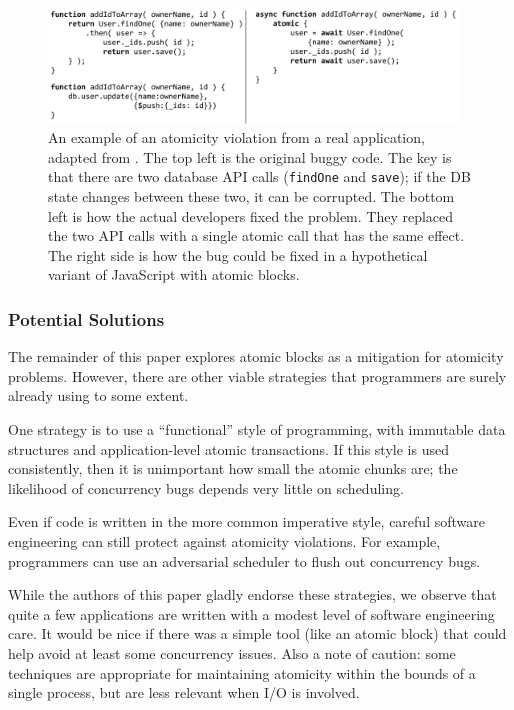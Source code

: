 \documentclass[acmsmall,anonymous,review]{acmart}\settopmatter{printfolios=true,printccs=false,printacmref=false}
\begin{document}
\begin{figure}
\includegraphics[width=0.97\textwidth]{Code/atomicity_violation}
\caption{An example of an atomicity violation from a real application, adapted from \cite{Wang2017}.
  The top left is the original buggy code.
  The key is that there are two database API calls (\texttt{findOne} and \texttt{save}); if the DB state changes between these two, it can be corrupted.
  The bottom left is how the actual developers fixed the problem.
  They replaced the two API calls with a single atomic call that has the same effect.
  The right side is how the bug could be fixed in a hypothetical variant of JavaScript with atomic blocks.}
\label{fig:atomicity_violation}
\end{figure}




\subsubsection{Potential Solutions}

The remainder of this paper explores atomic blocks as a mitigation for atomicity problems.
However, there are other viable strategies that programmers are surely already using to some extent.

One strategy is to use a ``functional'' style of programming, with immutable data structures and application-level atomic transactions.
If this style is used consistently, then it is unimportant how small the atomic chunks are; the likelihood of concurrency bugs depends very little on scheduling.

Even if code is written in the more common imperative style, careful software engineering can still protect against atomicity violations.
For example, programmers can use an adversarial scheduler to flush out concurrency bugs.

While the authors of this paper gladly endorse these strategies, we observe that quite a few applications are written with a modest level of software engineering care.
It would be nice if there was a simple tool (like an atomic block) that could help avoid at least some concurrency issues.
Also a note of caution: some techniques are appropriate for maintaining atomicity within the bounds of a single process, but are less relevant when I/O is involved.
\end{document}
